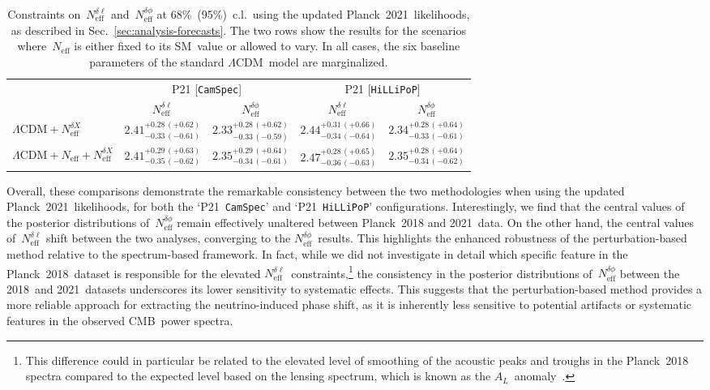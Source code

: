 \documentclass[11pt]{article}
\numberwithin{equation}{section}
\newcommand{\Neff}{N_\mathrm{eff}}
\newcommand{\Nphase}{N_\mathrm{eff}^{\delta\phi}}
\newcommand{\Nmultipole}{N_\mathrm{eff}^{\delta\ell}}
\begin{document}
\begin{table}
	\centering
	\begin{tabular}{l c c c c}
			\toprule
															& \multicolumn{2}{c}{P21 [\texttt{CamSpec}]}													& \multicolumn{2}{c}{P21 [\texttt{HiLLiPoP}]}													\\
															  \cmidrule(lr){2-3}																			  \cmidrule(lr){4-5}
															& {$\Nmultipole$}								& {$\Nphase$}									& {$\Nmultipole$}								& {$\Nphase$}									\\
			\midrule[0.065em]
		$\Lambda\mathrm{CDM} + \Neff^{\delta X}$			& $2.41^{+0.28\, (+0.62)}_{-0.33\, (-0.61)}$	& $2.33^{+0.28\, (+0.62)}_{-0.33\, (-0.59)}$	& $2.44^{+0.31\, (+0.66)}_{-0.34\, (-0.64)}$	& $2.34^{+0.28\, (+0.64)}_{-0.33\, (-0.61)}$	\\[4pt]
		$\Lambda\mathrm{CDM} + \Neff + \Neff^{\delta X}$	& $2.41^{+0.29\, (+0.63)}_{-0.35\, (-0.62)}$	& $2.35^{+0.29\, (+0.64)}_{-0.34\, (-0.61)}$	& $2.47^{+0.28\, (+0.65)}_{-0.36\, (-0.63)}$	& $2.35^{+0.28\, (+0.64)}_{-0.34\, (-0.62)}$	\\[2pt]
			\bottomrule
	\end{tabular}
	\caption{Constraints on~$\Nmultipole$ and~$\Nphase$ at 68\%~(95\%)~c.l.\ using the updated Planck~2021~likelihoods, as described in Sec.~\ref{sec:analysis-forecasts}. The two rows show the results for the scenarios where~$\Neff$ is either fixed to its SM~value or allowed to vary. In all cases, the six baseline parameters of the standard $\Lambda$CDM~model are marginalized.}
	\label{tab:PR4_analysis}
\end{table}

Overall, these comparisons demonstrate the remarkable consistency between the two methodologies when using the updated Planck~2021~likelihoods, for both the `P21~\texttt{CamSpec}' and `P21~\texttt{HiLLiPoP}' configurations. Interestingly, we find that the central values of the posterior distributions of~$\Nphase$ remain effectively unaltered between Planck~2018 and 2021~data. On the other hand, the central values of~$\Nmultipole$ shift between the two analyses, converging to the $\Nphase$~results. This highlights the enhanced robustness of the perturbation-based method relative to the spectrum-based framework. In fact, while we did not investigate in detail which specific feature in the Planck~2018~dataset is responsible for the elevated $\Nmultipole$~constraints,\footnote{This difference could in particular be related to the elevated level of smoothing of the acoustic peaks and troughs in the Planck~2018 spectra compared to the expected level based on the lensing spectrum, which is known as the $A_L$~anomaly~\cite{Planck:2018vyg}.} the consistency in the posterior distributions of~$\Nphase$ between the 2018~and 2021~datasets underscores its lower sensitivity to systematic effects. This suggests that the perturbation-based method provides a more reliable approach for extracting the neutrino-induced phase shift, as it is inherently less sensitive to potential artifacts or systematic features in the observed CMB~power spectra.
\end{document}
